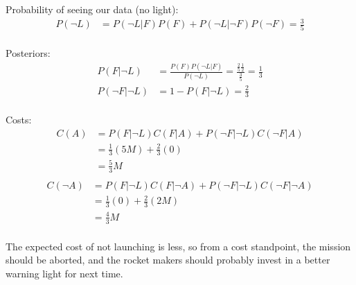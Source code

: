 \begin{enumerate}[label=\textbf{\Alph*}.]
    Probability of seeing our data (no light):
    \begin{align*}
        P(\neg L) &= P(\neg L|F)P(F) + P(\neg L|\neg F)P(\neg F) = \frac{3}{5} \\
    \end{align*}

    Posteriors:
    \begin{align*}
        P(F|\neg L) &= \frac{P(F) P(\neg L | F)}{P(\neg L)}
        = \frac{\frac{2}{5} \frac{1}{2}}{\frac{3}{5}} 
        = \frac{1}{3} \\
        P(\neg F|\neg L) &= 1 - P(F|\neg L)
        = \frac{2}{3} \\
    \end{align*}

    Costs:
    \begin{align*}
        C(A) &= P(F|\neg L)C(F|A) + P(\neg F|\neg L)C(\neg F|A)\\
        &= \frac{1}{3}(5M) + \frac{2}{3}(0)\\
        &= \frac{5}{3}M\\
    \end{align*}
    \begin{align*}
        C(\neg A) &= P(F|\neg L)C(F|\neg A) + P(\neg F|\neg L)C(\neg F|\neg A)\\
        &= \frac{1}{3}(0) + \frac{2}{3}(2M)\\
        &= \frac{4}{3}M\\
    \end{align*}

    The expected cost of not launching is less, so from a cost standpoint, the mission should be aborted, and the rocket makers should probably invest in a better warning light for next time.

\end{enumerate}
